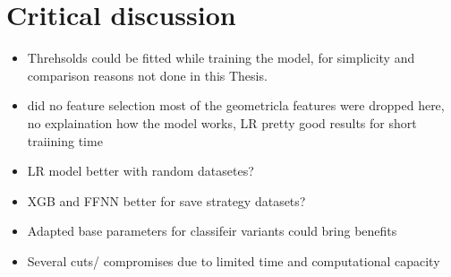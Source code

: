 \chapter{Critical discussion}
\label{chap:critical_discussion}
\begin{itemize}
    \item Threhsolds could be fitted while training the model, for simplicity and comparison reasons not done in this Thesis.
    \item \cite{zhang_learning-based_2022} did no feature selection most of the geometricla features were dropped here, no
          explaination how the model works, \gls{LR} pretty good results for short traiining time
    \item LR model better with random datasetes?
    \item XGB and FFNN better for save strategy datasets?
    \item Adapted base parameters for classifeir variants could bring benefits
    \item Several cuts/ compromises due to limited time and computational capacity
\end{itemize}

\clearpage
